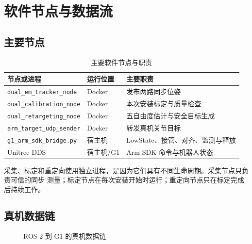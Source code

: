 \section{软件节点与数据流}
\label{sec:ch3_software_dataflow}

\subsection{主要节点}
\label{subsec:ch3_main_nodes}

\begin{table}[htbp]
  \centering
  \caption{主要软件节点与职责}
  \label{tab:ch3_main_nodes}
  \begin{tabularx}{\linewidth}{@{}lXX@{}}
    \toprule
    节点或进程 & 运行位置 & 主要职责 \\
    \midrule
    \texttt{dual\_em\_tracker\_node} & Docker & 发布两路同步位姿 \\
    \texttt{dual\_calibration\_node} & Docker & 本次安装标定与质量检查 \\
    \texttt{dual\_retargeting\_node} & Docker & 五自由度估计与安全目标生成 \\
    \texttt{arm\_target\_udp\_sender} & Docker & 转发真机关节目标 \\
    \texttt{g1\_arm\_sdk\_bridge.py} & 宿主机 & LowState、接管、对齐、监测与释放 \\
    Unitree DDS & 宿主机/G1 & Arm SDK 命令与机器人状态 \\
    \bottomrule
  \end{tabularx}
\end{table}

采集、标定和重定向使用独立进程，是因为它们具有不同生命周期。采集节点只负责可信的同步
测量；标定节点在每次安装开始时运行；重定向节点只在标定完成后持续工作。

\subsection{真机数据链}
\label{subsec:ch3_real_robot_path}

\begin{figure}[htbp]
  \centering
  \caption{ROS 2 到 G1 的真机数据链}
  \label{fig:ch3_real_robot_path}
\end{figure}

